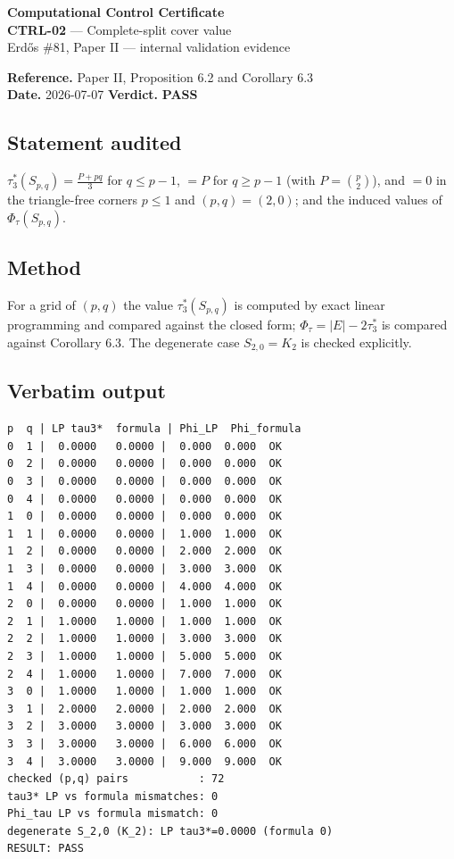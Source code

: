 \documentclass[11pt]{article}
\begin{document}
\begin{center}{\Large\textbf{Computational Control Certificate}}\\[2pt]
{\large \textbf{CTRL-02} --- Complete-split cover value}\\[2pt]
Erd\H{o}s \#81, Paper II --- internal validation evidence\\
\end{center}
\vspace{0.3em}
\noindent\textbf{Reference.} Paper II, Proposition 6.2 and Corollary 6.3\\
\textbf{Date.} 2026-07-07 \qquad \textbf{Verdict.} \textcolor{pass}{\textbf{PASS}}

\subsection*{Statement audited}
$\tau_3^*(S_{p,q})=\tfrac{P+pq}{3}$ for $q\le p-1$, $=P$ for $q\ge p-1$ (with $P=\binom p2$), and $=0$ in the triangle-free corners $p\le1$ and $(p,q)=(2,0)$; and the induced values of $\Phi_\tau(S_{p,q})$.

\subsection*{Method}
For a grid of $(p,q)$ the value $\tau_3^*(S_{p,q})$ is computed by exact linear programming and compared against the closed form; $\Phi_\tau=|E|-2\tau_3^*$ is compared against Corollary 6.3. The degenerate case $S_{2,0}=K_2$ is checked explicitly.

\subsection*{Verbatim output}
\begin{Verbatim}[fontsize=\small,frame=single]
p  q | LP tau3*  formula | Phi_LP  Phi_formula
0  1 |  0.0000   0.0000 |  0.000  0.000  OK
0  2 |  0.0000   0.0000 |  0.000  0.000  OK
0  3 |  0.0000   0.0000 |  0.000  0.000  OK
0  4 |  0.0000   0.0000 |  0.000  0.000  OK
1  0 |  0.0000   0.0000 |  0.000  0.000  OK
1  1 |  0.0000   0.0000 |  1.000  1.000  OK
1  2 |  0.0000   0.0000 |  2.000  2.000  OK
1  3 |  0.0000   0.0000 |  3.000  3.000  OK
1  4 |  0.0000   0.0000 |  4.000  4.000  OK
2  0 |  0.0000   0.0000 |  1.000  1.000  OK
2  1 |  1.0000   1.0000 |  1.000  1.000  OK
2  2 |  1.0000   1.0000 |  3.000  3.000  OK
2  3 |  1.0000   1.0000 |  5.000  5.000  OK
2  4 |  1.0000   1.0000 |  7.000  7.000  OK
3  0 |  1.0000   1.0000 |  1.000  1.000  OK
3  1 |  2.0000   2.0000 |  2.000  2.000  OK
3  2 |  3.0000   3.0000 |  3.000  3.000  OK
3  3 |  3.0000   3.0000 |  6.000  6.000  OK
3  4 |  3.0000   3.0000 |  9.000  9.000  OK
checked (p,q) pairs           : 72
tau3* LP vs formula mismatches: 0
Phi_tau LP vs formula mismatch: 0
degenerate S_2,0 (K_2): LP tau3*=0.0000 (formula 0)
RESULT: PASS

\end{Verbatim}
\end{document}
